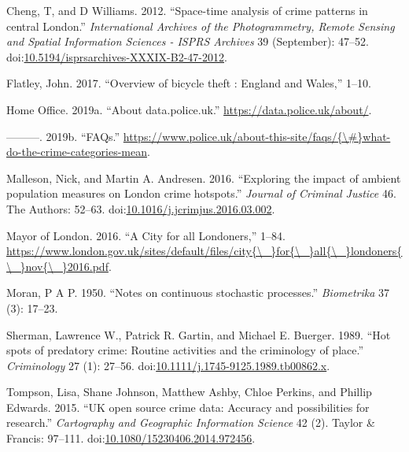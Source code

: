 \documentclass[]{article}
\theoremstyle{definition}
\theoremstyle{definition}
\theoremstyle{definition}
\theoremstyle{remark}
\begin{document}
\hypertarget{ref-Cheng2012}{}
Cheng, T, and D Williams. 2012. ``Space-time analysis of crime patterns
in central London.'' \emph{International Archives of the Photogrammetry,
Remote Sensing and Spatial Information Sciences - ISPRS Archives} 39
(September): 47--52.
doi:\href{https://doi.org/10.5194/isprsarchives-XXXIX-B2-47-2012}{10.5194/isprsarchives-XXXIX-B2-47-2012}.

\hypertarget{ref-Flatley2017}{}
Flatley, John. 2017. ``Overview of bicycle theft : England and Wales,''
1--10.

\hypertarget{ref-Office2019}{}
Home Office. 2019a. ``About data.police.uk.''
\url{https://data.police.uk/about/}.

\hypertarget{ref-HomeOffice2019}{}
---------. 2019b. ``FAQs.''
\href{https://www.police.uk/about-this-site/faqs/\%7B/\#\%7Dwhat-do-the-crime-categories-mean}{https://www.police.uk/about-this-site/faqs/\{\textbackslash{}\#\}what-do-the-crime-categories-mean}.

\hypertarget{ref-Malleson2016}{}
Malleson, Nick, and Martin A. Andresen. 2016. ``Exploring the impact of
ambient population measures on London crime hotspots.'' \emph{Journal of
Criminal Justice} 46. The Authors: 52--63.
doi:\href{https://doi.org/10.1016/j.jcrimjus.2016.03.002}{10.1016/j.jcrimjus.2016.03.002}.

\hypertarget{ref-MayorofLondon2016}{}
Mayor of London. 2016. ``A City for all Londoners,'' 1--84.
\href{https://www.london.gov.uk/sites/default/files/city\%7B/_\%7Dfor\%7B/_\%7Dall\%7B/_\%7Dlondoners\%7B/_\%7Dnov\%7B/_\%7D2016.pdf}{https://www.london.gov.uk/sites/default/files/city\{\textbackslash{}\_\}for\{\textbackslash{}\_\}all\{\textbackslash{}\_\}londoners\{\textbackslash{}\_\}nov\{\textbackslash{}\_\}2016.pdf}.

\hypertarget{ref-Moran1950}{}
Moran, P A P. 1950. ``Notes on continuous stochastic processes.''
\emph{Biometrika} 37 (3): 17--23.

\hypertarget{ref-Sherman1989}{}
Sherman, Lawrence W., Patrick R. Gartin, and Michael E. Buerger. 1989.
``Hot spots of predatory crime: Routine activities and the criminology
of place.'' \emph{Criminology} 27 (1): 27--56.
doi:\href{https://doi.org/10.1111/j.1745-9125.1989.tb00862.x}{10.1111/j.1745-9125.1989.tb00862.x}.

\hypertarget{ref-Tompson2015}{}
Tompson, Lisa, Shane Johnson, Matthew Ashby, Chloe Perkins, and Phillip
Edwards. 2015. ``UK open source crime data: Accuracy and possibilities
for research.'' \emph{Cartography and Geographic Information Science} 42
(2). Taylor \& Francis: 97--111.
doi:\href{https://doi.org/10.1080/15230406.2014.972456}{10.1080/15230406.2014.972456}.
\end{document}
